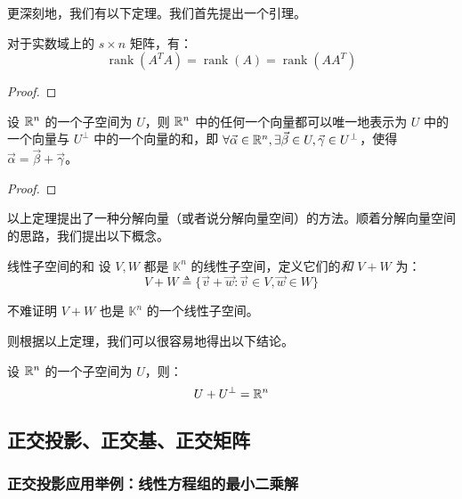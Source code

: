 更深刻地，我们有以下定理。我们首先提出一个引理。

\begin{theorem}
	对于实数域上的 $s \times n$ 矩阵，有：
	$$
	\operatorname{rank}(A^T A) = \operatorname{rank}(A) = \operatorname{rank}(AA^T)
	$$
\end{theorem}

\begin{proof}
\end{proof}

\begin{theorem}
	设 $\mathbb R^n$ 的一个子空间为 $U$，则 $\mathbb R^n$ 中的任何一个向量都可以唯一地表示为 $U$ 中的一个向量与 $U^\perp$ 中的一个向量的和，即 $\forall \vec \alpha \in \mathbb R^n, \exists \vec \beta \in U, \vec \gamma \in U^\perp$，使得 $\vec \alpha = \vec \beta + \vec \gamma$。
\end{theorem}

\begin{proof}
\end{proof}

以上定理提出了一种分解向量（或者说分解向量空间）的方法。顺着分解向量空间的思路，我们提出以下概念。

\begin{definition}{线性子空间的和}
	设 $V, W$ 都是 $\mathbb K^n$ 的线性子空间，定义它们的\emph{和} $V + W$ 为：
	$$
	V + W \triangleq \{\vec v + \vec w \colon \vec v \in V, \vec w \in W\}
	$$

	不难证明 $V + W$ 也是 $\mathbb K^n$ 的一个线性子空间。
\end{definition}

则根据以上定理，我们可以很容易地得出以下结论。

\begin{theorem}
	设 $\mathbb R^n$ 的一个子空间为 $U$，则：
	$$
	U + U^\perp = \mathbb R^n
	$$
\end{theorem}

\subsection{正交投影、正交基、正交矩阵}

\subsubsection{正交投影应用举例：线性方程组的最小二乘解}

